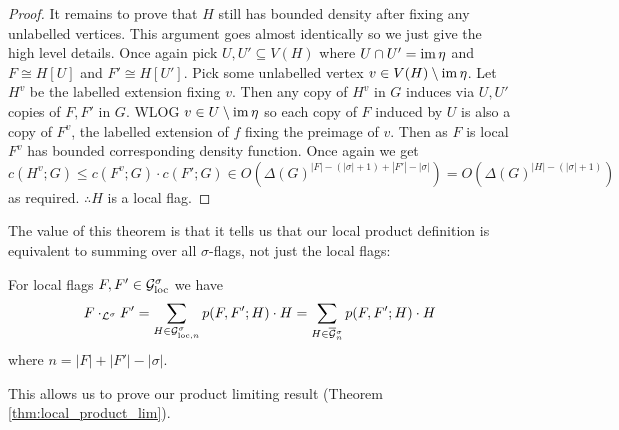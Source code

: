 \begin{proof}
    It remains to prove that $H$ still has bounded density after fixing any unlabelled vertices.
    This argument goes almost identically so we just give the high level details. Once again
    pick $U, U' \subseteq V(H)$ where $U\cap U'=\operatorname{im}\eta$ and $F\cong H[U]$ and $F' \cong H[U']$.
    Pick some unlabelled vertex $v\in V(H)\setminus \operatorname{im}\eta$.
    Let $H^v$ be the labelled extension fixing $v$. Then any copy of $H^v$ in $G$ induces
    via $U, U'$ copies of $F, F'$ in $G$. WLOG $v \in U \setminus \operatorname{im} \eta$ so each copy
    of $F$ induced by $U$ is also a copy of $F^v$, the labelled extension of $f$ fixing the
    preimage of $v$. Then as $F$ is local $F^v$ has bounded corresponding density
    function. Once again we get
    $c(H^v; G) \leq c(F^v; G) \cdot c(F'; G) \in
    O(\Delta(G)^{|F|-(|\sigma|+1)+|F'|-|\sigma|}) = O(\Delta(G)^{|H|-(|\sigma|+1)})$
    as required.  $\therefore H$ is a local flag.
\end{proof}

The value of this theorem is that it tells us that our local product definition is
equivalent to summing over all $\sigma$-flags, not just the local flags:

\begin{corollary}
    \label{corollary:local_product}
    For local flags $F, F' \in \mathcal{G}_\mathrm{loc}^\sigma$ we have
    \[
        F \cdot_{\mathcal{L}^\sigma} F'
        = \sum_{H\in\mathcal{G}_{\mathrm{loc},n}^\sigma}p(F, F'; H)\cdot H
        = \sum_{H\in\overline{\mathcal{G}}{}_n^\sigma}p(F, F'; H)\cdot H
    \]
    where $n=|F|+|F'|-|\sigma|$.
\end{corollary}

This allows us to prove our product limiting result (Theorem \ref{thm:local_product_lim}).

